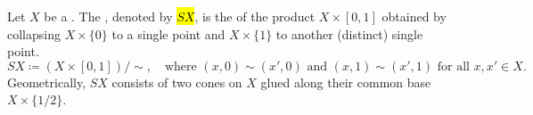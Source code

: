 \begin{definition} \label{definition:unreduced_suspension_of_a_topological_space}
    Let $X$ be a . The , denoted by \hl{$SX$}, is the  of the product $X \times [0,1]$ obtained by collapsing $X \times \{0\}$ to a single point and $X \times \{1\}$ to another (distinct) single point.
    \[
    SX \coloneqq (X \times [0,1]) / \sim, \quad \text{where } (x,0) \sim (x',0) \text{ and } (x,1) \sim (x',1) \text{ for all } x, x' \in X.
    \]
    Geometrically, $SX$ consists of two cones on $X$ glued along their common base $X \times \{1/2\}$.
\end{definition}